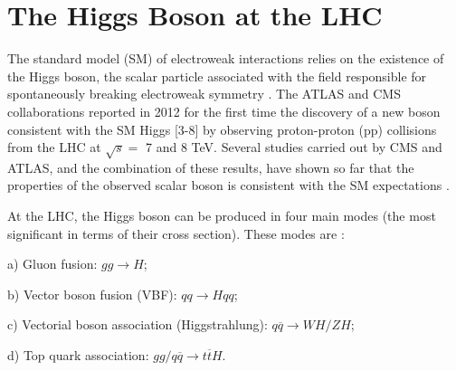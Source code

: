 \section{The Higgs Boson at the LHC}
The standard model (SM) of electroweak interactions relies on the existence of the Higgs boson, the scalar particle associated with the field responsible for spontaneously breaking electroweak symmetry \cite{bib:PhysRev22-579-1961,bib:PhysRevLett19-1264-1967}. The ATLAS and CMS collaborations reported in 2012 for the first time the discovery of a new boson consistent with the SM Higgs [3-8] by observing proton-proton (pp) collisions from the LHC at $\sqrt{s}=$ 7 and 8 TeV. Several studies carried out by CMS and ATLAS, and the combination of these results, have shown so far that the properties of the observed scalar boson is consistent with the SM expectations \cite{bib:CMS-PAS-HIG-14-038,bib:ATLAS-CONF-2015-004,bib:JPhys-455-1-2013,bib:CMS-HIG-13-002,bib:PhysRevLett110-081803-2013,bib:PhysRevD89-092007-2014}. 

At the LHC, the Higgs boson can be produced in four main modes (the most significant in terms of their cross section). These modes are \cite{bib:ellis-2003}:

\begin{flushleft}
	\quad a) Gluon fusion: $gg \rightarrow H$;
	
	\quad b) Vector boson fusion (VBF): $qq \rightarrow Hqq$;
	
	\quad c) Vectorial boson association (Higgstrahlung): $q \overline{q} \rightarrow WH/ZH$;
	
	\quad d) Top quark association: $gg/q \overline{q} \rightarrow t \overline{t} H$.
\end{flushleft}

